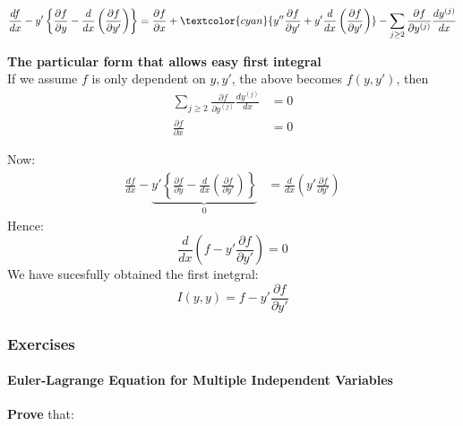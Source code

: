 \begin{equation}
\frac{df}{dx}-y'\left\{\frac{\partial f}{\partial y} - \frac{d}{dx}\left( \frac{\partial f}{\partial y'}\right)\right\} =\frac{\partial f}{\partial x} + \textcolor{cyan}{y''\frac{\partial f}{\partial y'}+ y'\frac{d}{dx}\left( \frac{\partial f}{\partial y'}\right)}-\sum_{j\geq 2}\frac{\partial f}{\partial y^{(j)}}\frac{dy^{(j)}}{dx}
\end{equation}

\begin{framed}
\textbf{The particular form that allows easy first integral}\\
If we assume $f$ is only dependent on $y,y'$, the above becomes $f(y,y')$, then
\begin{equation}
\begin{aligned}
\sum_{j\geq 2}\frac{\partial f}{\partial y^{(j)}}\frac{dy^{(j)}}{dx} &= 0\\ 
\frac{\partial f}{\partial x} &=0
\end{aligned}
\end{equation}
\end{framed}

Now:
\begin{equation}
\begin{aligned}
\frac{df}{dx}-\underbrace{y'\left\{\frac{\partial f}{\partial y} - \frac{d}{dx}\left( \frac{\partial f}{\partial y'}\right)\right\}}_{0}&= \frac{d}{dx}\left(y'\frac{\partial f}{\partial y'}\right)
\end{aligned}
\end{equation}
Hence:
\begin{equation}
\frac{d}{dx}\left(f-y'\frac{\partial f}{\partial y'}\right)=0
\end{equation}
We have sucesfully obtained the first inetgral:
\begin{equation}
I(y,y)=f-y'\frac{\partial f}{\partial y'}
\end{equation}

\subsubsection{Exercises}

\paragraph{Euler-Lagrange Equation for Multiple Independent Variables}

\textbf{Prove} that:

